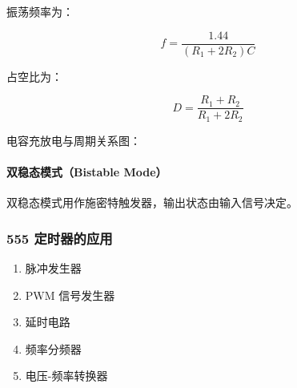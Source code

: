





振荡频率为：

\begin{equation}
f = \frac{1.44}{(R_1 + 2R_2)C} \label{eq:555-frequency}
\end{equation}

占空比为：

\begin{equation}
D = \frac{R_1 + R_2}{R_1 + 2R_2} \label{eq:555-duty-cycle}
\end{equation}

电容充放电与周期关系图：


\paragraph{双稳态模式（Bistable Mode）}

双稳态模式用作施密特触发器，输出状态由输入信号决定。

\subsubsection{555 定时器的应用}

\begin{enumerate}
  \item 脉冲发生器
  \item PWM 信号发生器
  \item 延时电路
  \item 频率分频器
  \item 电压-频率转换器
\end{enumerate}

